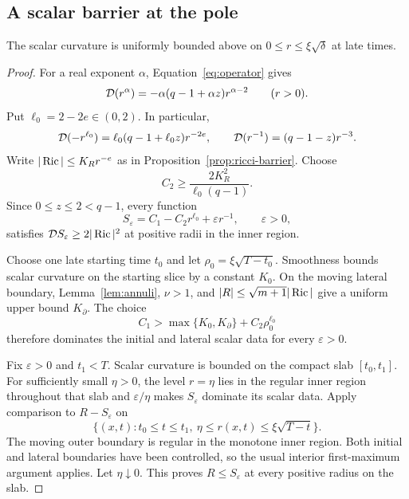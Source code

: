 \subsection{A scalar barrier at the pole}

\begin{proposition}\label{prop:scalar-inner}
The scalar curvature is uniformly bounded above on
\(0\le r\le\xi\sqrt\delta\) at late times.
\end{proposition}

\begin{proof}
For a real exponent \(\alpha\), Equation~\eqref{eq:operator} gives
\begin{equation}\label{eq:power-operator}
\mathcal D(r^\alpha)=-\alpha(q-1+\alpha z)r^{\alpha-2}
\qquad(r>0).
\end{equation}
Put \(\ell_0=2-2e\in(0,2)\). In particular,
\begin{equation}\label{eq:scalar-powers}
\mathcal D(-r^{\ell_0})=\ell_0(q-1+\ell_0z)r^{-2e},
\qquad \mathcal D(r^{-1})=(q-1-z)r^{-3}.
\end{equation}
Write \(|\operatorname{Ric}|\le K_Rr^{-e}\) as in Proposition~\ref{prop:ricci-barrier}.
Choose
\[
C_2\ge\frac{2K_R^2}{\ell_0(q-1)}.
\]
Since \(0\le z\le2<q-1\), every function
\begin{equation}\label{eq:scalar-barrier}
S_\varepsilon=C_1-C_2r^{\ell_0}+\varepsilon r^{-1},
\qquad \varepsilon>0,
\end{equation}
satisfies \(\mathcal D S_\varepsilon\ge2|\operatorname{Ric}|^2\) at positive radii in the
inner region.

Choose one late starting time \(t_0\) and let
\(\rho_0=\xi\sqrt{T-t_0}\). Smoothness bounds scalar curvature on
the starting slice by a constant \(K_0\). On the moving lateral boundary,
Lemma~\ref{lem:annuli}, \(\nu>1\), and
\(|R|\le\sqrt{m+1}|\operatorname{Ric}|\) give a uniform upper bound \(K_\partial\).
The choice
\begin{equation}\label{eq:C1-choice}
C_1>\max\{K_0,K_\partial\}+C_2\rho_0^{\ell_0}
\end{equation}
therefore dominates the initial and lateral scalar data for every
\(\varepsilon>0\).

Fix \(\varepsilon>0\) and \(t_1<T\). Scalar curvature is bounded on
the compact slab \([t_0,t_1]\). For sufficiently small \(\eta>0\), the
level \(r=\eta\) lies in the regular inner region throughout that slab
and \(\varepsilon/\eta\) makes \(S_\varepsilon\) dominate its scalar
data. Apply comparison to \(R-S_\varepsilon\) on
\[
\{(x,t):t_0\le t\le t_1,\ \eta\le r(x,t)\le\xi\sqrt{T-t}\}.
\]
The moving outer boundary is regular in the monotone inner region.
Both initial and lateral boundaries have been controlled, so the usual
interior first-maximum argument applies. Let \(\eta\downarrow0\).
This proves \(R\le S_\varepsilon\) at every positive radius on the slab.


\end{proof}
